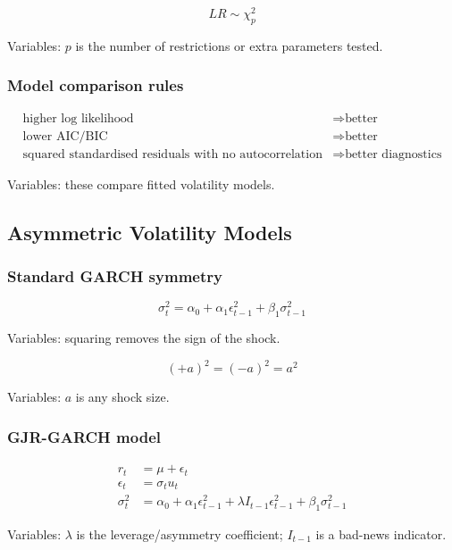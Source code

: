\documentclass[
  8pt,
  twocolumn]{extarticle}
\begin{document}
\[
LR\sim\chi_p^2
\]

Variables: \(p\) is the number of restrictions or extra parameters
tested.

\subsubsection{Model comparison rules}\label{model-comparison-rules}

\[
\begin{aligned}
\text{higher log likelihood}&\Rightarrow \text{better}\\
\text{lower AIC/BIC}&\Rightarrow \text{better}\\
\text{squared standardised residuals with no autocorrelation}&\Rightarrow \text{better diagnostics}
\end{aligned}
\]

Variables: these compare fitted volatility models.

\subsection{Asymmetric Volatility
Models}\label{asymmetric-volatility-models}

\subsubsection{Standard GARCH symmetry}\label{standard-garch-symmetry}

\[
\sigma_t^2=\alpha_0+\alpha_1\epsilon_{t-1}^2+\beta_1\sigma_{t-1}^2
\]

Variables: squaring removes the sign of the shock.

\[
(+a)^2=(-a)^2=a^2
\]

Variables: \(a\) is any shock size.

\subsubsection{GJR-GARCH model}\label{gjr-garch-model}

\[
\begin{aligned}
r_t&=\mu+\epsilon_t\\
\epsilon_t&=\sigma_tu_t\\
\sigma_t^2&=\alpha_0+\alpha_1\epsilon_{t-1}^2+\lambda I_{t-1}\epsilon_{t-1}^2+\beta_1\sigma_{t-1}^2
\end{aligned}
\]

Variables: \(\lambda\) is the leverage/asymmetry coefficient;
\(I_{t-1}\) is a bad-news indicator.
\end{document}
